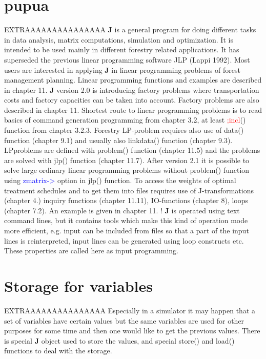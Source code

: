 \section*{pupua}
EXTRAAAAAAAAAAAAAAA
\textbf{J} is a general program for doing different tasks in data analysis, matrix computations,
simulation and optimization. It is intended to be used mainly in different forestry related
applications. It has superseded the previous linear programming software JLP (Lappi 1992).
Most users are interested in applying \textbf{J} in linear programming problems of forest management
planning. Linear programming functions and examples are described in chapter 11. \textbf{J} version
2.0 is introducing factory problems where transportation costs and factory capacities can be
taken into account. Factory problems are also described in chapter 11. Shortest route to linear
programming problems is to read basics of command generation programming from chapter
3.2, at least \textcolor{Red}{;incl}() function from chapter 3.2.3. Forestry LP-problem requires also use of
\textcolor{VioletRed}{data}() function (chapter 9.1) and usually also \textcolor{VioletRed}{linkdata}() function (chapter 9.3). LPproblems are defined with \textcolor{VioletRed}{problem}() function (chapter 11.5) and the problems are solved
with \textcolor{VioletRed}{jlp}() function (chapter 11.7). After version 2.1 it is possible to solve large ordinary linear
programming problems without \textcolor{VioletRed}{problem}() function using \textcolor{blue}{zmatrix->} option in \textcolor{VioletRed}{jlp}()
function. To access the weights of optimal treatment schedules and to get them into files
requires use of J-transformations (chapter 4.) inquiry functions (chapter 11.11), IO-functions
(chapter 8), loops (chapter 7.2). An example is given in chapter 11.
!
\textbf{J} is operated using text command lines, but it contains tools which make this kind of operation
mode more efficient, e.g. input can be included from files so that a part of the input lines is
reinterpreted, input lines can be generated using loop constructs etc. These properties are
called here as input programming.
\section*{Storage for variables}
EXTRAAAAAAAAAAAAAAA
Especially in a simulator it may happen that a set of variables have certain
values but the same variables are used for other purposes for some time and
then one would like to get the previous values. There is special \textbf{J} object used
to store the values, and special store() and load() functions to deal with the
storage.
